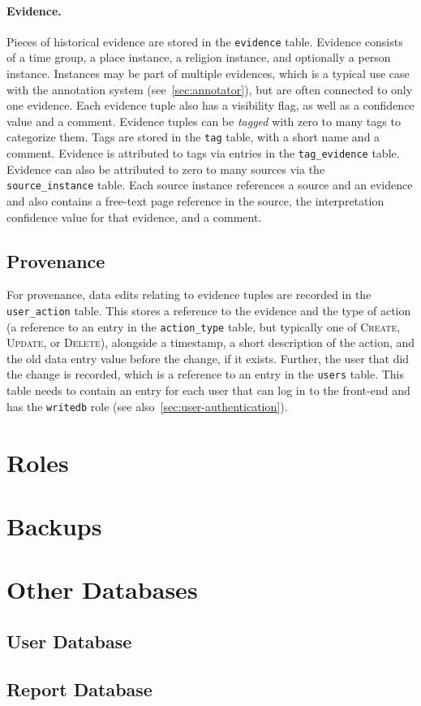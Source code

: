 \paragraph{Evidence.}\label{par:evidence}
Pieces of historical evidence are stored in the \verb!evidence! table.
Evidence consists of a time group, a place instance, a religion instance, and optionally a person instance.
Instances may be part of multiple evidences, which is a typical use case with the annotation system (see~\cref{sec:annotator}), but are often connected to only one evidence.
Each evidence tuple also has a visibility flag, as well as a confidence value and a comment.
Evidence tuples can be \emph{tagged} with zero to many tags to categorize them.
Tags are stored in the \verb!tag! table, with a short name and a comment.
Evidence is attributed to tags via entries in the \verb!tag_evidence! table.
Evidence can also be attributed to zero to many sources via the \verb!source_instance! table.
Each source instance references a source and an evidence and also contains a free-text page reference in the source, the interpretation confidence value for that evidence, and a comment.



\subsection{Provenance}
\label{sec:provenance-tables}

For provenance, data edits relating to evidence tuples are recorded in the \verb!user_action! table.
This stores a reference to the evidence and the type of action (a reference to an entry in the \verb!action_type! table, but typically one of \textsc{Create}, \textsc{Update}, or \textsc{Delete}), alongside a timestamp, a short description of the action, and the old data entry value before the change, if it exists.
Further, the user that did the change is recorded, which is a reference to an entry in the \verb!users! table.
This table needs to contain an entry for each user that can log in to the front-end and has the \verb!writedb! role (see also~\cref{sec:user-authentication}).


\section{Roles}
\section{Backups}
\section{Other Databases}
\subsection{User Database}
\subsection{Report Database}
